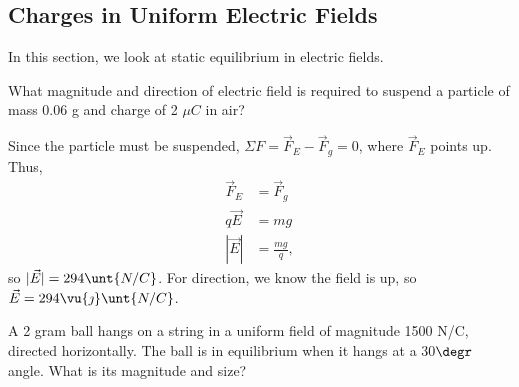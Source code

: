 \documentclass[11pt]{article}
\begin{document}
\subsection{Charges in Uniform Electric Fields}
In this section, we look at static equilibrium in electric fields.
\begin{example}
	What magnitude and direction of electric field is required to suspend a particle of mass 0.06 g and charge of 2 $\mu C$ in air?
\end{example}
\begin{solution}
	Since the particle must be suspended, $\Sigma F = \vec{F}_E - \vec{F}_g = 0$, where $\vec{F}_E$ points up. Thus,
	\begin{align*}
		\vec{F}_E &= \vec{F}_g \\
		q\vec{E} &= mg \\
		|\vec{E}| &= \frac{mg}{q},
	\end{align*}
	so $|\vec{E}| = 294\unt{N/C}$. For direction, we know the field is up, so $\vec{E} = 294\vu{\jmath}\unt{N/C}$.
\end{solution}
\begin{example}\label{chargeex1}
	A 2 gram ball hangs on a string in a uniform field of magnitude 1500 N/C, directed horizontally. The ball is in equilibrium when it hangs at a 30$\degr$ angle. What is its magnitude and size?
\end{example}
\end{document}
